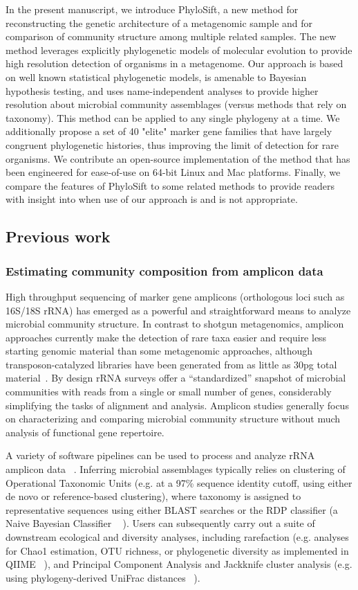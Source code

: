 \documentclass[10pt]{article}
\begin{document}
In the present manuscript, we introduce PhyloSift, a new method for reconstructing the genetic architecture of a metagenomic sample and for comparison of community structure among multiple related samples.
The new method leverages explicitly phylogenetic models of molecular evolution to provide high resolution detection of organisms in a metagenome. 
Our approach is based on well known statistical phylogenetic models, is amenable to Bayesian hypothesis testing, and uses name-independent analyses to provide higher resolution about microbial community assemblages (versus methods that rely on taxonomy). This method can be applied to any single phylogeny at a time.
We additionally propose a set of 40 "elite" marker gene families that have largely congruent phylogenetic histories, thus improving the limit of detection for rare organisms.
We contribute an open-source implementation of the method that has been engineered for ease-of-use on 64-bit Linux and Mac platforms.
Finally, we compare the features of PhyloSift to some related methods to provide readers with insight into when use of our approach is and is not appropriate.


\subsection*{Previous work}

\subsubsection*{Estimating community composition from amplicon data}
High throughput sequencing of marker gene amplicons (orthologous loci such as 16S/18S rRNA) has emerged as a powerful and straightforward means to analyze microbial community structure.
In contrast to shotgun metagenomics, amplicon approaches currently make the detection of rare taxa easier and require less starting genomic material than some metagenomic approaches, although transposon-catalyzed libraries have been generated from as little as 30pg total material~\cite{Adey2010}.
By design rRNA surveys offer a ``standardized'' snapshot of microbial communities with reads from a single or small number of genes, considerably simplifying the tasks of alignment and analysis. 
Amplicon studies generally focus on characterizing and comparing microbial community structure without much analysis of functional gene repertoire. 

A variety of software pipelines can be used to process and analyze rRNA amplicon data ~\cite{Bik2012}. 
Inferring microbial assemblages typically relies on clustering of Operational Taxonomic Units (e.g. at a 97\% sequence identity cutoff, using either de novo or reference-based clustering), where taxonomy is assigned to representative sequences using either BLAST searches or the RDP classifier (a Naive Bayesian Classifier ~\cite{Wang2007} ).
Users can subsequently carry out a suite of downstream ecological and diversity analyses, including rarefaction (e.g. analyses for Chao1 estimation, OTU richness, or phylogenetic diversity as implemented in QIIME ~\cite{Caporaso2010}), and Principal Component Analysis and Jackknife cluster analysis (e.g. using phylogeny-derived UniFrac distances ~\cite{Lozupone2005}).
\end{document}
